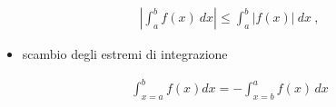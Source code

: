 \documentclass[letterpaper,10pt,italian]{jupyterBook}
\begin{document}
\begin{equation}\label{equation:ch/infinitesimal_calculus/integrals:infinitesimal-calculus:integrals:prop:abs}
\begin{split}\left| \int_a^b f(x) \ dx \right| \le \int_a^b | f(x) | \ dx \ ,\end{split}
\end{equation}\begin{itemize}
\item {} 
\sphinxAtStartPar
scambio degli estremi di integrazione

\end{itemize}
\begin{equation}\label{equation:ch/infinitesimal_calculus/integrals:infinitesimal-calculus:integrals:prop:swap}
\begin{split}\int_{x=a}^{b} f(x) dx = - \int_{x=b}^{a} f(x) \, dx\end{split}
\end{equation}
\end{document}
